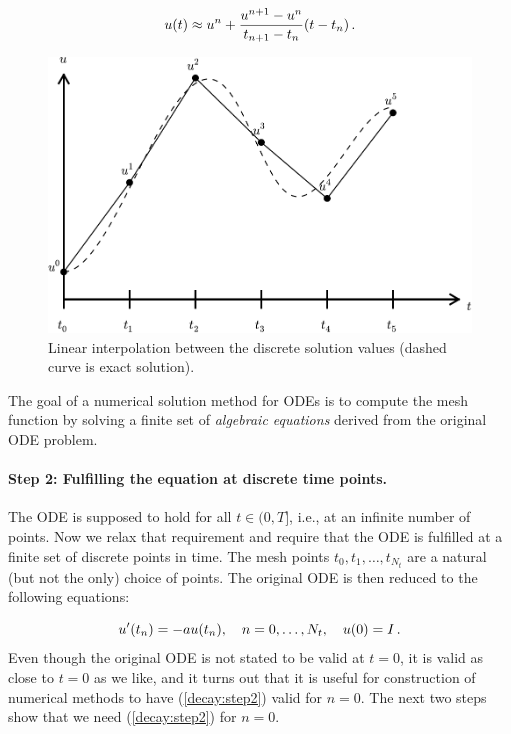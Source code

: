 \documentclass[%
oneside,                 %
final,                   %
10pt]{article}
\newenvironment{notice_mdfboxadmon}[1][]{
\begin{notice_mdfboxmdframed}[frametitle=#1]
}
{
\end{notice_mdfboxmdframed}
}
\begin{document}
\begin{equation}
u(t) \approx u^n + \frac{u^{n+1}-u^n}{t_{n+1}-t_n}(t - t_n)\thinspace .
\end{equation}


\begin{figure}[!ht]  %
  \centerline{\includegraphics[width=1.0\linewidth]{fig-alg/fdm_u_uei.pdf}}
  \caption{
  Linear interpolation between the discrete solution values (dashed curve is exact solution). \label{decay:fdu:ei}
  }
\end{figure}


\clearpage


\begin{notice_mdfboxadmon}[Notice.]
The goal of a numerical solution method for ODEs is
to compute the mesh function by solving a finite set of
\emph{algebraic equations} derived from the original ODE problem.
\end{notice_mdfboxadmon}



\paragraph{Step 2: Fulfilling the equation at discrete time points.}
The ODE is supposed to hold for all $t\in (0,T]$, i.e., at an infinite
number of points. Now we relax that requirement and require that
the ODE is fulfilled at a finite set of discrete points in time.
The mesh points $t_0,t_1,\ldots,t_{N_t}$ are a natural
(but not the only) choice of points.
The original ODE is then reduced to  the following equations:

\begin{equation}
u^{\prime}(t_n) = -au(t_n),\quad n=0,\ldots,N_t,\quad u(0)=I\thinspace .
\label{decay:step2}
\end{equation}
Even though the original ODE is not stated to be valid at $t=0$, it
is valid as close to $t=0$ as we like, and it turns out that it
is useful for construction of numerical methods to have
(\ref{decay:step2}) valid for $n=0$. The next two steps show that we
need (\ref{decay:step2}) for $n=0$.
\end{document}
